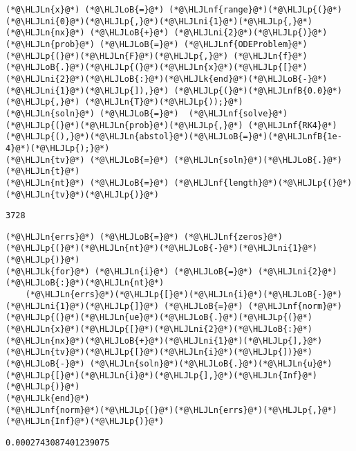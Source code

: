 \documentclass[12pt,a4paper]{article}
\newcommand{\HLJLk}[1]{\textcolor[RGB]{148,91,176}{\textbf{#1}}}
\newcommand{\HLJLn}[1]{#1}
\newcommand{\HLJLnf}[1]{\textcolor[RGB]{66,102,213}{#1}}
\newcommand{\HLJLnfB}[1]{\textcolor[RGB]{59,151,46}{#1}}
\newcommand{\HLJLni}[1]{\textcolor[RGB]{59,151,46}{#1}}
\newcommand{\HLJLoB}[1]{\textcolor[RGB]{102,102,102}{\textbf{#1}}}
\newcommand{\HLJLp}[1]{#1}
\begin{document}
\begin{lstlisting}
(*@\HLJLn{x}@*) (*@\HLJLoB{=}@*) (*@\HLJLnf{range}@*)(*@\HLJLp{(}@*)(*@\HLJLni{0}@*)(*@\HLJLp{,}@*)(*@\HLJLni{1}@*)(*@\HLJLp{,}@*)(*@\HLJLn{nx}@*) (*@\HLJLoB{+}@*) (*@\HLJLni{2}@*)(*@\HLJLp{)}@*)
(*@\HLJLn{prob}@*) (*@\HLJLoB{=}@*) (*@\HLJLnf{ODEProblem}@*)(*@\HLJLp{(}@*)(*@\HLJLn{F}@*)(*@\HLJLp{,}@*) (*@\HLJLn{f}@*)(*@\HLJLoB{.}@*)(*@\HLJLp{(}@*)(*@\HLJLn{x}@*)(*@\HLJLp{[}@*)(*@\HLJLni{2}@*)(*@\HLJLoB{:}@*)(*@\HLJLk{end}@*)(*@\HLJLoB{-}@*)(*@\HLJLni{1}@*)(*@\HLJLp{]),}@*) (*@\HLJLp{(}@*)(*@\HLJLnfB{0.0}@*)(*@\HLJLp{,}@*) (*@\HLJLn{T}@*)(*@\HLJLp{));}@*)
(*@\HLJLn{soln}@*) (*@\HLJLoB{=}@*)  (*@\HLJLnf{solve}@*)(*@\HLJLp{(}@*)(*@\HLJLn{prob}@*)(*@\HLJLp{,}@*) (*@\HLJLnf{RK4}@*)(*@\HLJLp{(),}@*)(*@\HLJLn{abstol}@*)(*@\HLJLoB{=}@*)(*@\HLJLnfB{1e-4}@*)(*@\HLJLp{);}@*)
(*@\HLJLn{tv}@*) (*@\HLJLoB{=}@*) (*@\HLJLn{soln}@*)(*@\HLJLoB{.}@*)(*@\HLJLn{t}@*)
(*@\HLJLn{nt}@*) (*@\HLJLoB{=}@*) (*@\HLJLnf{length}@*)(*@\HLJLp{(}@*)(*@\HLJLn{tv}@*)(*@\HLJLp{)}@*)
\end{lstlisting}

\begin{lstlisting}
3728
\end{lstlisting}


\begin{lstlisting}
(*@\HLJLn{errs}@*) (*@\HLJLoB{=}@*) (*@\HLJLnf{zeros}@*)(*@\HLJLp{(}@*)(*@\HLJLn{nt}@*)(*@\HLJLoB{-}@*)(*@\HLJLni{1}@*)(*@\HLJLp{)}@*)
(*@\HLJLk{for}@*) (*@\HLJLn{i}@*) (*@\HLJLoB{=}@*) (*@\HLJLni{2}@*)(*@\HLJLoB{:}@*)(*@\HLJLn{nt}@*)
    (*@\HLJLn{errs}@*)(*@\HLJLp{[}@*)(*@\HLJLn{i}@*)(*@\HLJLoB{-}@*)(*@\HLJLni{1}@*)(*@\HLJLp{]}@*) (*@\HLJLoB{=}@*) (*@\HLJLnf{norm}@*)(*@\HLJLp{(}@*)(*@\HLJLn{ue}@*)(*@\HLJLoB{.}@*)(*@\HLJLp{(}@*)(*@\HLJLn{x}@*)(*@\HLJLp{[}@*)(*@\HLJLni{2}@*)(*@\HLJLoB{:}@*)(*@\HLJLn{nx}@*)(*@\HLJLoB{+}@*)(*@\HLJLni{1}@*)(*@\HLJLp{],}@*)(*@\HLJLn{tv}@*)(*@\HLJLp{[}@*)(*@\HLJLn{i}@*)(*@\HLJLp{])}@*) (*@\HLJLoB{-}@*) (*@\HLJLn{soln}@*)(*@\HLJLoB{.}@*)(*@\HLJLn{u}@*)(*@\HLJLp{[}@*)(*@\HLJLn{i}@*)(*@\HLJLp{],}@*)(*@\HLJLn{Inf}@*)(*@\HLJLp{)}@*)
(*@\HLJLk{end}@*)
(*@\HLJLnf{norm}@*)(*@\HLJLp{(}@*)(*@\HLJLn{errs}@*)(*@\HLJLp{,}@*)(*@\HLJLn{Inf}@*)(*@\HLJLp{)}@*)
\end{lstlisting}

\begin{lstlisting}
0.0002743087401239075
\end{lstlisting}
\end{document}
